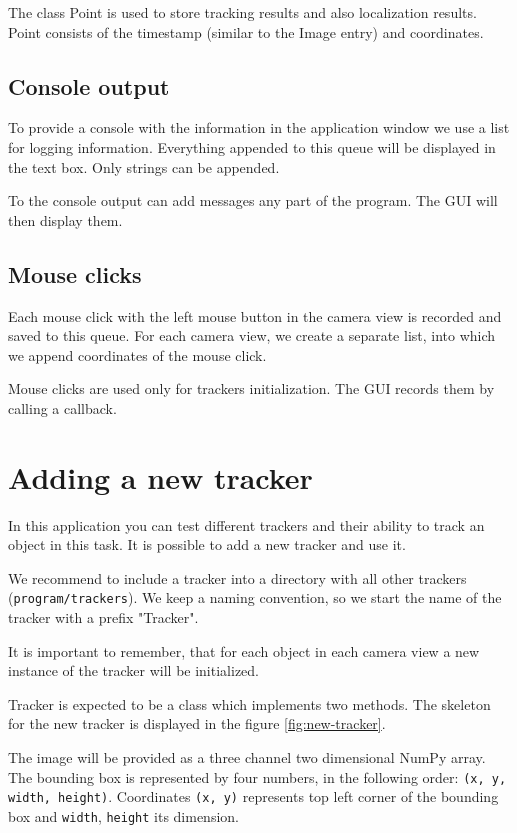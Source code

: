 The class Point is used to store tracking results and also localization
results. Point consists of the timestamp (similar to the Image entry) and
coordinates.

\subsection*{Console output}

To provide a console with the information in the application window we use a
list for logging information. Everything appended to this queue will be
displayed in the text box. Only strings can be appended.

To the console output can add messages any part of the program. The GUI will
then display them.

\subsection*{Mouse clicks}

Each mouse click with the left mouse button in the camera view is recorded and
saved to this queue. For each camera view, we create a separate list, into
which we append coordinates of the mouse click.

Mouse clicks are used only for trackers initialization. The GUI records them by
calling a callback.

\section{Adding a new tracker} 

In this application you can test different
trackers and their ability to track an object in this task. It is possible to
add a new tracker and use it.

We recommend to include a tracker into a directory with all other trackers
(\verb+program/trackers+). We keep a naming convention, so we start the name of
the tracker with a prefix "Tracker".

It is important to remember, that for each object in each camera view a new
instance of the tracker will be initialized.

Tracker is expected to be a class which implements two methods. The skeleton
for the new tracker is displayed in the figure \ref{fig:new-tracker}.

The image will be provided as a three channel two dimensional NumPy array. The
bounding box is represented by four numbers, in the following order: \verb+(x, y, width, height)+.
Coordinates \verb+(x, y)+ represents top left corner of
the bounding box and \verb+width+, \verb+height+ its dimension.


